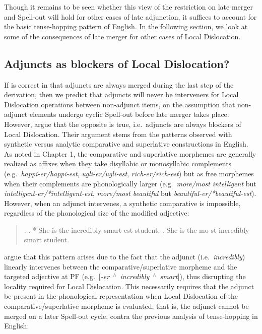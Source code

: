 Though it remains to be seen whether this view of the restriction on late merger and Spell-out will hold for other cases of late adjunction, it suffices to account for the basic tense-hopping pattern of English. In the following section, we look at some of the consequences of late merger for other cases of Local Dislocation.

\subsection{Adjuncts as blockers of Local Dislocation?}\label{adjunct_block_sec}
If \citet{stepanov2000} is correct in that adjuncts are always merged during the last step of the derivation, then we predict that adjuncts will never be interveners for Local Dislocation operations between non-adjunct items, on the assumption that non-adjunct elements undergo cyclic Spell-out before late merger takes place. However, \citet{embick_noyer2001} argue that the opposite is true, i.e.\ adjuncts are always blockers of Local Dislocation. Their argument stems from the patterns observed with synthetic versus analytic comparative and superlative constructions in English. As noted in Chapter 1, the comparative and superlative morphemes are generally realized as affixes when they take disyllabic or monosyllabic complements (e.g.\ {\it happi-er/happi-est}, {\it ugli-er/ugli-est}, {\it rich-er/rich-est}) but as free morphemes when their complements are phonologically larger (e.g.\ {\it more/most intelligent} but {\it *intelligent-er/*intelligent-est}, {\it more/most beautiful} but {\it *beautiful-er/*beautiful-est}). However, when an adjunct intervenes, a synthetic comparative is impossible, regardless of the phonological size of the modified adjective:

\singlespacing
\begin{quote}
\ex.
\a. * She is the incredibly smart-est student. 
\b. She is the mo-st incredibly smart student.

\end{quote}
\onehalfspacing
\citeauthor{embick_noyer2001} argue that this pattern arises due to the fact that the adjunct (i.e.\ {\it incredibly}) linearly intervenes between the comparative/superlative morpheme and the targeted adjective at PF (e.g.\ [{\it -er}~$^{\wedge}$~{\it incredibly}~$^{\wedge}$~{\it smart}]), thus disrupting the locality required for Local Dislocation. This necessarily requires that the adjunct be present in the phonological representation when Local Dislocation of the comparative/superlative morpheme is evaluated, that is, the adjunct cannot be merged on a later Spell-out cycle, contra the previous analysis of tense-hopping in English.

